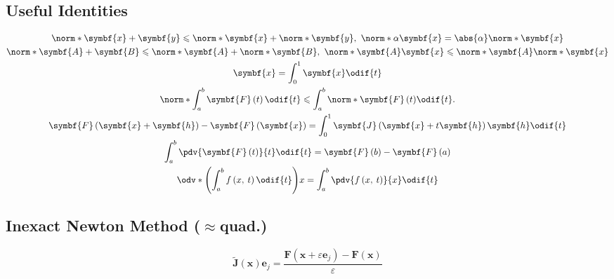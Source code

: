 \documentclass{article}
\begin{document}
\begin{minipage}[t]{62.39259259mm}
    \subsection{Useful Identities}
    \begin{gather*}
        \norm*{\symbf{x} + \symbf{y}} \leqslant \norm*{\symbf{x}} + \norm*{\symbf{y}},\ \norm*{\alpha \symbf{x}} = \abs{\alpha} \norm*{\symbf{x}} \\
        \norm*{\symbf{A} + \symbf{B}} \leqslant \norm*{\symbf{A}} + \norm*{\symbf{B}},\ \norm*{\symbf{A} \symbf{x}} \leqslant \norm*{\symbf{A}} \norm*{\symbf{x}} \\
        \symbf{x} = \int_0^1 \symbf{x} \odif{t}\\
        \norm*{\int_a^b \symbf{F}\left( t \right) \odif{t}} \leqslant \int_a^b \norm*{\symbf{F}\left( t \right)} \odif{t}. \\
        \symbf{F}\left( \symbf{x} + \symbf{h} \right) - \symbf{F}\left( \symbf{x} \right) = \int_0^1 \symbf{J}\left( \symbf{x} + t \symbf{h} \right) \symbf{h} \odif{t} \\
        \int_a^b \pdv{\symbf{F}\left( t \right)}{t} \odif{t} = \symbf{F}\left( b \right) - \symbf{F}\left( a \right) \\
        \odv*{\left( \int_a^b f\left( x,\: t \right) \odif{t} \right)}{x} = \int_a^b \pdv{f\left( x,\: t \right)}{x} \odif{t}
    \end{gather*}
    \subsection{Inexact Newton Method (\texorpdfstring{\(\approx\)}{~}quad.)}
    \begin{equation*}
        \tilde{\symbf{J}}\left( \symbf{x} \right) \symbf{e}_j = \frac{\symbf{F}\left( \symbf{x} + \varepsilon \symbf{e}_j \right) - \symbf{F}\left( \symbf{x} \right)}{\varepsilon}
    \end{equation*}
\end{minipage}
\end{document}
